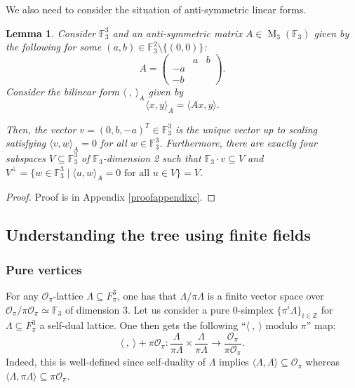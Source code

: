 \documentclass{eptcs}
\newtheorem{lemma}[theorem]{Lemma}
\theoremstyle{remark}
\theoremstyle{definition}
\DeclareMathOperator{\M}{M}
\begin{document}
We also need to consider the situation of anti-symmetric linear forms.
\begin{lemma}
\label{antisym}
Consider $\mathbb{F}_{3}^{3}$ and an anti-symmetric matrix $A \in \M_{3}(\mathbb{F}_{3})$ given by the following for some $(a,b) \in \mathbb{F}_{3}^{2} \setminus \{(0,0)\}$:
\begin{equation}
    A 
    =  \left(
    \begin{smallmatrix}
	\ &  a & b \\ 
	-a & & \\ 
	-b & & 
    \end{smallmatrix}
    \right) .
\end{equation}
Consider the bilinear form $\langle\ , \ \rangle_{A}$ given by 
\begin{equation}
    \langle x,y\rangle_{A}  = \langle A x, y \rangle.
\end{equation}

Then, the vector $v=(0,b,-a)^{T} \in \mathbb{F}_{3}^{3}$ is the unique vector up to scaling satisfying $\langle v ,w \rangle_{A} = 0$ for all $w \in \mathbb{F}_{3}^{3}$. Furthermore, there are exactly four subspaces $V \subseteq \mathbb{F}_{3}^{3}$ of $\mathbb{F}_{3}$-dimension 2 such that $\mathbb{F}_{3} \cdot v \subseteq V$ and $V^{\perp} = \{ w \in \mathbb{F}_{3}^{3} \mid \langle u,w \rangle_{A} = 0 \text{ for all }u \in V\} = V$.
\end{lemma}
\begin{proof}
Proof is in Appendix \ref{proofappendixc}.
\end{proof}



\subsection{Understanding the tree using finite fields}

\subsubsection{Pure vertices}

For any $\mathcal{O}_{\pi}$-lattice $\Lambda \subseteq F_{\pi}^{3}$, one has that $\Lambda / \pi \Lambda $ is a finite vector space over $\mathcal{O}_{\pi}/\pi \mathcal{O}_{\pi} \simeq \mathbb{F}_{3}$ of dimension $3$.
Let us consider a pure $0$-simplex $\{\pi^{i} \Lambda\}_{i \in \mathbb{Z}}$ for $\Lambda \subseteq F_{\pi}^{3}$ a self-dual lattice. 
One then gets the following ``$\langle \ , \ \rangle$ modulo $\pi$'' map:
\begin{equation}
    \langle \ , \ \rangle + \pi \mathcal{O}_{\pi} : \frac{\Lambda}{\pi \Lambda} \times \frac{\Lambda}{ \pi \Lambda } \to \frac{\mathcal{O}_{\pi}}{ \pi \mathcal{O}_{\pi}}.
    \label{eq:defi_of_angle}
\end{equation}
Indeed, this is well-defined since self-duality of $\Lambda$ implies $\langle \Lambda , \Lambda \rangle \subseteq \mathcal{O}_{\pi}$ whereas $\langle \Lambda , \pi \Lambda \rangle \subseteq \pi \mathcal{O}_{\pi}$.
\end{document}
